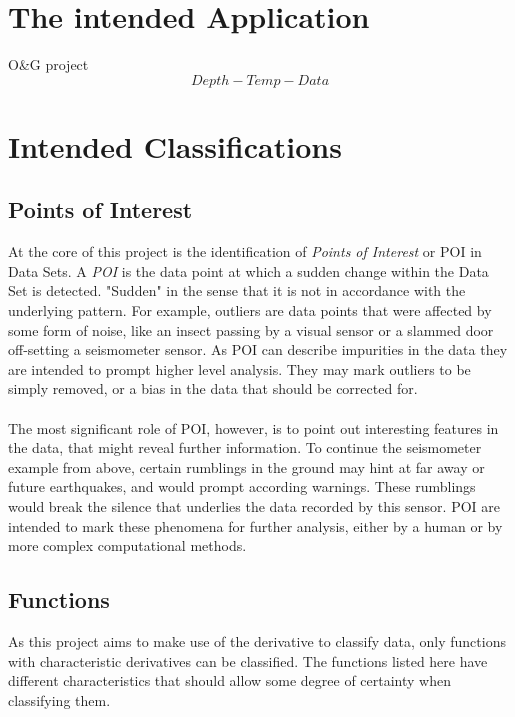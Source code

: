 \documentclass[main.tex]{subfiles}
\begin{document}
    
  \section{The intended Application}
    
    O\&G project
    \[Depth-Temp-Data\]
    
  \section{Intended Classifications}
    
    \subsection{Points of Interest}  
      
      At the core of this project is the identification of \textit{Points of Interest} or POI in Data Sets. A \textit{POI} is the data point at which a sudden change within the Data Set is detected. "Sudden" in the sense that it is not in accordance with the underlying pattern. For example, outliers are data points that were affected by some form of noise, like an insect passing by a visual sensor or a slammed door off-setting a seismometer sensor. As POI can describe impurities in the data they are intended to prompt higher level analysis. They may mark outliers to be simply removed, or a bias in the data that should be corrected for. 
      \\\\
      The most significant role of POI, however, is to point out interesting features in the data, that might reveal further information. To continue the seismometer example from above, certain rumblings in the ground may hint at far away or future earthquakes, and would prompt according warnings. These rumblings would break the silence that underlies the data recorded by this sensor. POI are intended to mark these phenomena for further analysis, either by a human or by more complex computational methods.
      
    \subsection{Functions}
      
      As this project aims to make use of the derivative to classify data, only functions with characteristic derivatives can be classified. The functions listed here have different characteristics that should allow some degree of certainty when classifying them.
\end{document}

